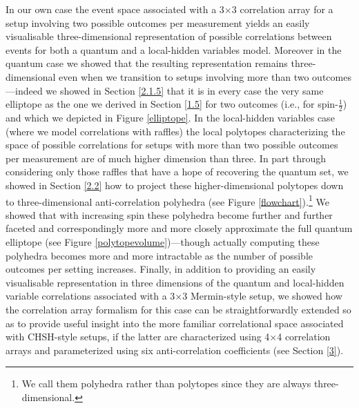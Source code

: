 In our own case the event space associated with a 3$\times$3 correlation array for a setup involving two possible outcomes per measurement yields an easily visualisable three-dimensional representation of possible correlations between events for both a quantum and a local-hidden variables model. Moreover in the quantum case we showed that the resulting representation remains three-dimensional even when we transition to setups involving more than two outcomes---indeed we showed in Section \ref{2.1.5} that it is in every case the very same elliptope as the one we derived in Section \ref{1.5} for two outcomes (i.e., for spin-$\frac12$) and which we depicted in Figure \ref{elliptope}. In the local-hidden variables case (where we model correlations with raffles) the local polytopes characterizing the space of possible correlations for setups with more than two possible outcomes per measurement are of much higher dimension than three. In part through considering only those raffles that have a hope of recovering the quantum set, we showed in Section \ref{2.2} how to project these higher-dimensional polytopes down to three-dimensional anti-correlation polyhedra (see Figure \ref{flowchart}).\footnote{We call them polyhedra rather than polytopes since they are always three-dimensional.} We showed that with increasing spin these polyhedra become further and further faceted and correspondingly more and more closely approximate the full quantum elliptope (see Figure \ref{polytopevolume})---though actually computing these polyhedra becomes more and more intractable as the number of possible outcomes per setting increases. Finally, in addition to providing an easily visualisable representation in three dimensions of the quantum and local-hidden variable correlations associated with a 3$\times$3 Mermin-style setup, we showed how the correlation array formalism for this case can be straightforwardly extended so as to provide useful insight into the more familiar correlational space associated with CHSH-style setups, if the latter are characterized using 4$\times$4 correlation arrays and parameterized using six anti-correlation coefficients (see Section \ref{3}).

